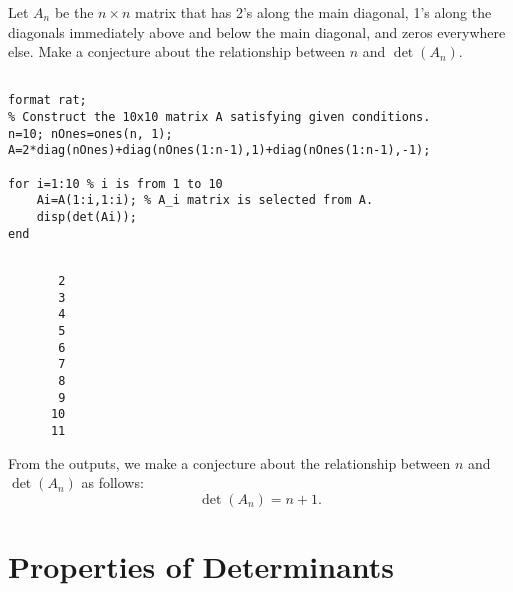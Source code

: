 \vspace{3mm}


\begin{exer} Let $A_{n}$ be the $n \times n$ matrix that has 2's along the main diagonal, 1's along the diagonals immediately above and below the main diagonal, and zeros everywhere else. Make a conjecture about the relationship between $n$ and $\det(A_{n})$.
\end{exer}



\begin{sol}
\begin{verbatim}

format rat;
% Construct the 10x10 matrix A satisfying given conditions.
n=10; nOnes=ones(n, 1);
A=2*diag(nOnes)+diag(nOnes(1:n-1),1)+diag(nOnes(1:n-1),-1);

for i=1:10 % i is from 1 to 10
    Ai=A(1:i,1:i); % A_i matrix is selected from A. 
    disp(det(Ai));
end
\end{verbatim}

\begin{outputs}
\begin{verbatim}

       2     
       3       
       4       
       5       
       6       
       7       
       8       
       9       
      10       
      11  
\end{verbatim}
\end{outputs}


\noindent From the outputs, we make a conjecture about the relationship between $n$ and $\det(A_{n})$ as follows:
$$\det(A_{n})=n+1.$$

\end{sol}


\section{Properties of Determinants}


